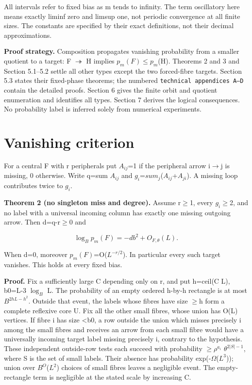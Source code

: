 \documentclass[11pt]{article}
\begin{document}
All intervals refer to fixed bias as m tends to infinity. The term oscillatory here means exactly liminf zero and limsup one, not periodic convergence at all finite sizes. The constants are specified by their exact definitions, not their decimal approximations.

\textbf{Proof strategy.} Composition propagates vanishing probability from a smaller quotient to a target: F \ensuremath{\twoheadrightarrow} H implies $p_m(F)$\ensuremath{\leq}$p_m$(H). Theorems 2 and 3 and Section 5.1--5.2 settle all other types except the two forced-fibre targets. Section 5.3 states their fixed-phase theorems; the numbered \texttt{technical appendices A--D} contain the detailed proofs. Section 6 gives the finite orbit and quotient enumeration and identifies all types. Section 7 derives the logical consequences. No probability label is inferred solely from numerical experiments.

\section{Vanishing criterion}

For a central F with r peripherals put $A_{ij}$=1 if the peripheral arrow i\ensuremath{\to}j is missing, 0 otherwise. Write q=sum $A_{ij}$ and $g_{i}$=$sum_{j}$($A_{ij}$+$A_{ji}$). A missing loop contributes twice to $g_{i}$.

\textbf{Theorem 2 (no singleton miss and degree).} Assume r\ensuremath{\geq}1, every $g_{i}$\ensuremath{\geq}2, and no label with a universal incoming column has exactly one missing outgoing arrow. Then d=q-r\ensuremath{\geq}0 and

\[
\log_B p_m(F)=-db^2+O_{F,\theta}(L).
\]

When d=0, moreover $p_m(F)$=O($L^{-r/2}$). In particular every such target vanishes. This holds at every fixed bias.

\textbf{Proof.} Fix a sufficiently large C depending only on r, and put h=ceil(C L), b0=L-3 $\log_B$ L. The probability of an empty ordered h-by-h rectangle is at most $B^{2hL-h^2}$. Outside that event, the labels whose fibres have size \ensuremath{\geq}h form a complete reflexive core U. Fix all the other small fibres, whose union has O(L) vertices. If fibre i has size <b0, a row outside the union which misses precisely i among the small fibres and receives an arrow from each small fibre would have a universally incoming target label missing precisely i, contrary to the hypothesis. These independent outside-row tests each succeed with probability \ensuremath{\geq}$\rho^{a_i}$ $\theta^{2|S|-1}$, where S is the set of small labels. Their absence has probability exp(-$\Omega$($L^{3}$)); union over $B^{O}$($L^{2}$) choices of small fibres leaves a negligible event. The empty-rectangle term is negligible at the stated scale by increasing C.
\end{document}
